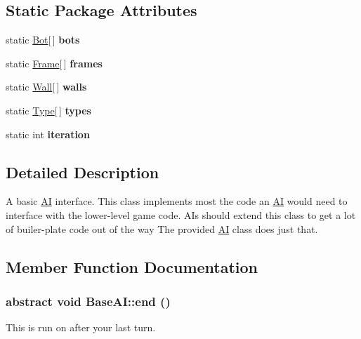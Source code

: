 \subsection*{Static Package Attributes}
\begin{DoxyCompactItemize}
\item 
\hypertarget{classBaseAI_a201fc0bad05f5cd5a8fa0c38d1b8f393}{
static \hyperlink{classBot}{Bot}\mbox{[}$\,$\mbox{]} {\bfseries bots}}
\label{classBaseAI_a201fc0bad05f5cd5a8fa0c38d1b8f393}

\item 
\hypertarget{classBaseAI_a858e9e6dead0b8b9dc2a13db34d66d5e}{
static \hyperlink{classFrame}{Frame}\mbox{[}$\,$\mbox{]} {\bfseries frames}}
\label{classBaseAI_a858e9e6dead0b8b9dc2a13db34d66d5e}

\item 
\hypertarget{classBaseAI_a5149adb4efc5b8fc7370b747592e2ae5}{
static \hyperlink{classWall}{Wall}\mbox{[}$\,$\mbox{]} {\bfseries walls}}
\label{classBaseAI_a5149adb4efc5b8fc7370b747592e2ae5}

\item 
\hypertarget{classBaseAI_a82450c46af1b8f5ef7b6470803105e5a}{
static \hyperlink{classType}{Type}\mbox{[}$\,$\mbox{]} {\bfseries types}}
\label{classBaseAI_a82450c46af1b8f5ef7b6470803105e5a}

\item 
\hypertarget{classBaseAI_ad7942cee117a347f7cb841ff4800408f}{
static int {\bfseries iteration}}
\label{classBaseAI_ad7942cee117a347f7cb841ff4800408f}

\end{DoxyCompactItemize}


\subsection{Detailed Description}
A basic \hyperlink{classAI}{AI} interface. This class implements most the code an \hyperlink{classAI}{AI} would need to interface with the lower-\/level game code. AIs should extend this class to get a lot of builer-\/plate code out of the way The provided \hyperlink{classAI}{AI} class does just that. 

\subsection{Member Function Documentation}
\hypertarget{classBaseAI_afb1c3a00ed081e9efdfff9f7d1e6910d}{
\subsubsection[{end}]{\setlength{\rightskip}{0pt plus 5cm}abstract void BaseAI::end ()}}
\label{classBaseAI_afb1c3a00ed081e9efdfff9f7d1e6910d}
This is run on after your last turn. 

